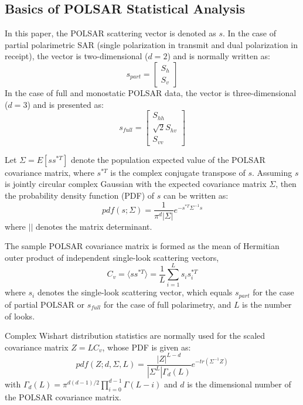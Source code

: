 \documentclass[journal]{IEEEtran}
\begin{document}
\subsection{Basics of POLSAR Statistical Analysis}
\label{sec:model_basic}

In this paper, the POLSAR scattering vector is denoted as $s$.
In the case of partial polarimetric SAR (single polarization in transmit and dual polarization in receipt),
  the vector is two-dimensional ($d=2$) and is normally written as: 
\begin{equation}
s_{part}=\begin{bmatrix}
S_h\\ 
S_v
\end{bmatrix}
\end{equation}
In the case of full and monostatic POLSAR data,
  the vector is three-dimensional ($d=3$) and is presented as:
\begin{equation}
s_{full}=\begin{bmatrix}
S_{hh}\\
\sqrt{2}S_{hv}\\
S_{vv}
\end{bmatrix}
\end{equation}

Let $\Sigma=E [ss^{*T}]$ denote the population expected value of the POLSAR covariance matrix,
  where $s^{*T}$ is the complex conjugate transpose of $s$. 
Assuming %
  $s$ is jointly circular complex Gaussian with the expected covariance matrix $\Sigma$,
  then the probability density function (PDF) of $s$ can be written as:
\begin{equation}
  pdf(s;\Sigma)=\frac{1}{\pi^d|\Sigma|} e^{-s^{*T}\Sigma^{-1}s}
\end{equation}
where $||$ denotes the matrix determinant.

The sample POLSAR covariance matrix is formed as the mean of Hermitian outer product of independent single-look scattering vectors,
\begin{equation}
  C_v = \langle ss^{*T} \rangle = \frac{1}{L} \sum^L_{i=1}s_is_i^{*T}
\end{equation}
where $s_i$ denotes the single-look scattering vector,
  which equals $s_{part}$ for the case of partial POLSAR or
  $s_{full}$ for the case of full polarimetry,
and $L$ is the number of looks.

Complex Wishart distribution statistics are normally used for the scaled covariance matrix
$Z=LC_v$, whose PDF is given as:
\begin{equation}
  pdf(Z;d,\Sigma,L)=\frac{|Z|^{L-d}}{|\Sigma^L|\Gamma_d(L)}e^{-tr(\Sigma^{-1}Z)}
\end{equation}
with $\Gamma_d(L) = \pi^{d(d-1)/2} \prod^{d-1}_{i=0}\Gamma(L-i)$
and $d$ is the dimensional number of the POLSAR covariance matrix.
\end{document}
